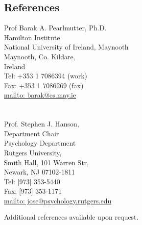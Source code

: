 \documentclass[10pt,overlapped,line]{res}
\begin{document}
\begin{resume}
\pagebreak
 \section{References}
  \begin{multicols}{2}
 {\small
    Prof Barak A. Pearlmutter, Ph.D. \\
    Hamilton Institute \\
    National University of Ireland, Maynooth \\
    Maynooth, Co. Kildare, \\
    Ireland \\
    Tel: +353 1 7086394 (work) \\
    Fax: +353 1 7086269 (fax) \\
    \href{URL}{mailto: barak@cs.may.ie} \\
\\
\\
    Prof. Stephen J. Hanson, \\
    Department Chair \\
    Psychology Department \\
    Rutgers University, \\
    Smith Hall, 101 Warren Str, \\
    Newark, NJ 07102-1811 \\
    Tel: [973] 353-5440 \\
    Fax: [973] 353-1171 \\
    \href{URL}{mailto: jose@psychology.rutgers.edu} \\
 }
 \end{multicols}

Additional references available upon request.



\end{resume}
\end{document}
